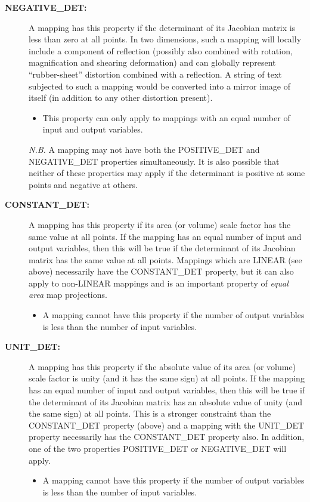 \documentclass[twoside,11pt]{article}
\newcommand{\name}[1]{\mbox{\small{#1}}}
\begin{document}
\begin{description}
\item[\textbf{NEGATIVE\_DET:}] A mapping has this property if the determinant
of its Jacobian matrix is less than zero at all points. 
In two dimensions, such a mapping will locally include a component of
reflection (possibly also combined with rotation, magnification and shearing
deformation) and can globally represent ``rubber-sheet'' distortion
combined with a reflection.
A string of text subjected to such a mapping would be converted into a
mirror image of itself (in addition to any other distortion present). 

\begin{itemize}
\item This property can only apply to mappings with an equal number of input
and output variables. 
\end{itemize}

\emph{N.B.} A mapping may not have both the \name{POSITIVE\_DET} and
\name{NEGATIVE\_DET} properties simultaneously. 
It is also possible that neither of these properties may apply if the
determinant is positive at some points and negative at others. 

\item[\textbf{CONSTANT\_DET:}] A mapping has this property if its area (or 
volume) scale factor has the same value at all points. 
If the mapping has an equal number of input and output variables, then this
will be true if the determinant of its Jacobian matrix has the same value at
all points. 
Mappings which are \name{LINEAR} (see above) necessarily have the
\name{CONSTANT\_DET} property, but it can also apply to non-\name{LINEAR}
mappings and is an important property of \emph{equal area} map projections.

\begin{itemize}
\item A mapping cannot have this property if the number of output variables
is less than the number of input variables. 
\end{itemize}

\item[\textbf{UNIT\_DET:}]  A mapping has this property if the absolute value of
its area (or volume) scale factor is unity (and it has the same sign) at all
points. 
If the mapping has an equal number of input and output variables, then this
will be true if the determinant of its Jacobian matrix has an absolute value
of unity (and the same sign) at all points. 
This is a stronger constraint than the \name{CONSTANT\_DET} property (above)
and a mapping with the \name{UNIT\_DET} property necessarily has the
\name{CONSTANT\_DET} property also. 
In addition, one of the two properties \name{POSITIVE\_DET} or
\name{NEGATIVE\_DET} will apply. 

\begin{itemize}
\item A mapping cannot have this property if the number of output variables
is less than the number of input variables. 
\end{itemize}

\end{description}
\end{document}
